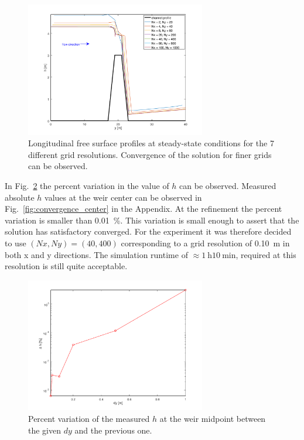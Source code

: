 \begin{figure}[h]
  \centering
  \includegraphics[width=0.7\textwidth]{Figures/water_profiles.png}
  \caption{Longitudinal free surface profiles at steady-state conditions for the \num{7} different grid resolutions. Convergence of the solution for finer grids can be observed.}
  \label{fig:water_profiles}
\end{figure}

In Fig.~\ref{fig:diff_center} the percent variation in the value of $h$ can be observed.
Measured absolute $h$ values at the weir center can be observed in Fig.~\ref{fig:convergence_center} in the Appendix. 
At the  refinement the percent variation is smaller than \SI{0.01}{\percent}.
This variation is small enough to assert that the solution has satisfactory converged.
For the experiment it was therefore decided to use $(Nx, Ny) = (\num{40}, \num{400})$ corresponding to a grid resolution of \SI{0.10}{\m} in both x and y directions. The simulation runtime of $\approx \SI{1}{\hour} \SI{10}{\minute}$, required at this resolution is still quite acceptable.

\begin{figure}[h]
  \centering
  \includegraphics[width=0.7\textwidth]{Figures/diff_center.png}
  \caption{Percent variation of the measured $h$ at the weir midpoint between the given $dy$ and the previous one.}
  \label{fig:diff_center}
\end{figure}


